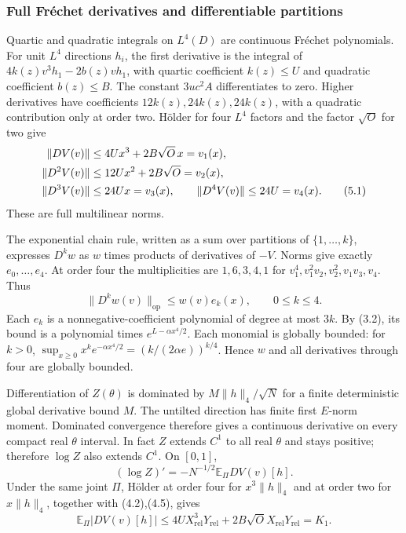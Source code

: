 \documentclass[11pt]{article}
\theoremstyle{plain}
\theoremstyle{definition}
\theoremstyle{remark}
\newcommand{\E}{\mathbb{E}}
\begin{document}
\subsubsection{Full Fr\'echet derivatives and differentiable partitions}
Quartic and quadratic integrals on $L^4(D)$ are continuous Fr\'echet
polynomials. For unit $L^4$ directions $h_i$, the first derivative is the
integral of $4k(z)v^3h_1-2b(z)vh_1$, with quartic coefficient $k(z)\le U$
and quadratic coefficient $b(z)\le B$. The constant $3uc^2A$
differentiates to zero. Higher derivatives have coefficients
$12k(z),24k(z),24k(z)$, with a quadratic contribution only at order two.
H\"older for four $L^4$ factors and the factor $\sqrt O$ for two give
\begin{align}
 \|DV(v)\|&\le4Ux^3+2B\sqrt O\,x=v_1(x),\notag\\
 \|D^2V(v)\|&\le12Ux^2+2B\sqrt O=v_2(x),\notag\\
 \|D^3V(v)\|&\le24Ux=v_3(x),\qquad
 \|D^4V(v)\|\le24U=v_4(x).\tag{5.1}
\end{align}
These are full multilinear norms.

The exponential chain rule, written as a sum over partitions of
$\{1,\ldots,k\}$, expresses $D^kw$ as $w$ times products of derivatives
of $-V$. Norms give exactly $e_0,\ldots,e_4$. At order four the
multiplicities are $1,6,3,4,1$ for
$v_1^4,v_1^2v_2,v_2^2,v_1v_3,v_4$. Thus
\begin{equation}
 \|D^kw(v)\|_{\mathrm{op}}\le w(v)e_k(x),\qquad0\le k\le4.\tag{5.2}
\end{equation}
Each $e_k$ is a nonnegative-coefficient polynomial of degree at most $3k$.
By (3.2), its bound is a polynomial times $e^{L-\alpha x^4/2}$.
Each monomial is globally bounded: for $k>0$,
$\sup_{x\ge0}x^ke^{-\alpha x^4/2}=(k/(2\alpha e))^{k/4}$.
Hence $w$ and all derivatives through four are globally bounded.

Differentiation of $Z(\theta)$ is dominated by
$M\|h\|_4/\sqrt N$ for a finite deterministic global derivative bound $M$.
The untilted direction has finite first $E$-norm moment. Dominated
convergence therefore gives a continuous derivative on every compact real
$\theta$ interval. In fact $Z$ extends $C^1$ to all real $\theta$ and stays
positive; therefore $\log Z$ also extends $C^1$. On $[0,1]$,
\begin{equation}
 (\log Z)'=-N^{-1/2}\E_\Pi DV(v)[h].\tag{5.3}
\end{equation}
Under the same joint $\Pi$, H\"older at order four for $x^3\|h\|_4$ and
at order two for $x\|h\|_4$, together with (4.2),(4.5), gives
\begin{equation}
 \E_\Pi|DV(v)[h]|\le4UX_{\mathrm{rel}}^3Y_{\mathrm{rel}}
       +2B\sqrt O X_{\mathrm{rel}}Y_{\mathrm{rel}}=K_1.\tag{5.4}
\end{equation}
\end{document}
